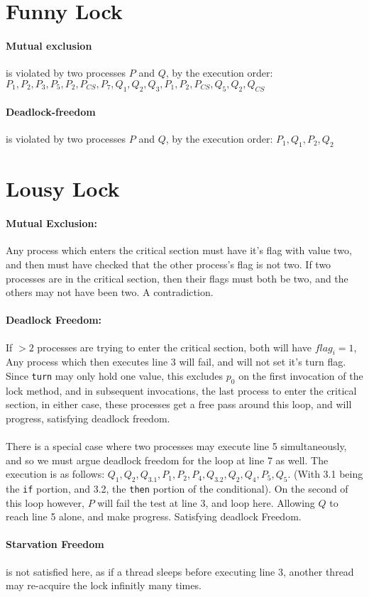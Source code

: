 \documentclass[12pt]{article}
\begin{document}
\maketitle


\section{Funny Lock}
\paragraph{Mutual exclusion}is violated by two processes $P$ and $Q$, by the execution order: $P_1, P_2, P_3, P_5, P_2, P_{CS}, P_7, Q_1, Q_2, Q_3, P_1, P_2, P_{CS}, Q_5, Q_2, Q_{CS}$
\paragraph{Deadlock-freedom}is violated by two processes $P$ and $Q$, by the execution order: $P_1, Q_1, P_2, Q_2$

\section{Lousy Lock}
\paragraph{Mutual Exclusion:} Any process which enters the critical section must have it's flag with value two, and then must have checked that the other process's flag is not two. If two processes are in the critical section, then their flags must both be two, and the others may not have been two. A contradiction.
\paragraph{Deadlock Freedom:} If $>2$ processes are trying to enter the critical section, both will have $flag_i = 1$, Any process which then executes line 3 will fail, and will not set it's turn flag. Since \texttt{turn} may only hold one value, this excludes $p_0$ on the first invocation of the lock method, and in subsequent invocations, the last process to enter the critical section, in either case, these processes get a free pass around this loop, and will progress, satisfying deadlock freedom.
\paragraph{} There is a special case where two processes may execute line 5 simultaneously, and so we must argue deadlock freedom for the loop at line 7 as well. The execution is as follows:  $Q_1, Q_2, Q_{3.1}, P_1, P_2, P_4, Q_{3.2}, Q_2, Q_4, P_5, Q_5$. (With 3.1 being the \texttt{if} portion, and 3.2, the \texttt{then} portion of the conditional). On the second of this loop however, $P$ will fail the test at line 3, and loop here. Allowing $Q$ to reach line 5 alone, and make progress. Satisfying deadlock Freedom.
\paragraph{Starvation Freedom} is not satisfied here, as if a thread sleeps before executing line 3, another thread may re-acquire the lock infinitly many times.
\end{document}
